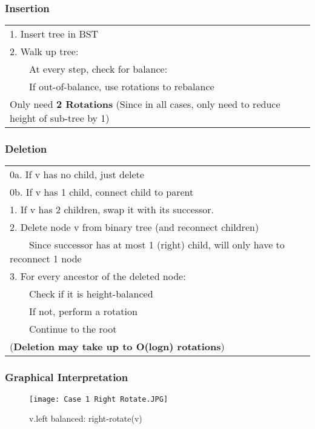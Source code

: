 \documentclass{article}
\newcommand{\tabitem}{~~\llap{\textbullet}~~}
\begin{document}
    \subsubsection{Insertion}

    \begin{tabular}{l}
        1. Insert tree in BST \\
        2. Walk up tree:\\
        \tabitem At every step, check for balance:\\
        \tabitem If out-of-balance, use rotations to rebalance\\    
        Only need \textbf{2 Rotations} (Since in all cases, only need to reduce height of sub-tree by 1)\\  
    \end{tabular}
    

    \subsubsection{Deletion}

    \begin{tabular}{l}
        0a. If v has no child, just delete \\
        0b. If v has 1 child, connect child to parent\\
        1. If v has 2 children, swap it with its successor.\\
        2. Delete node v from binary tree (and reconnect children)\\
        \tabitem Since successor has at most 1 (right) child, will only have to reconnect 1 node\\
        3. For every ancestor of the deleted node:\\
        \tabitem Check if it is height-balanced\\
        \tabitem If not, perform a rotation\\
        \tabitem Continue to the root\\
        (\textbf{Deletion may take up to O(logn) rotations})\\        
    \end{tabular}


    \pagebreak
    
    \subsubsection{Graphical Interpretation}

    \begin{figure}[htbp]
        \begin{center}
        \texttt{[image: Case 1 Right Rotate.JPG]}
        \caption{v.left balanced: right-rotate(v)}
        \label{rightrot}
        \end{center}
    \end{figure}
\end{document}
